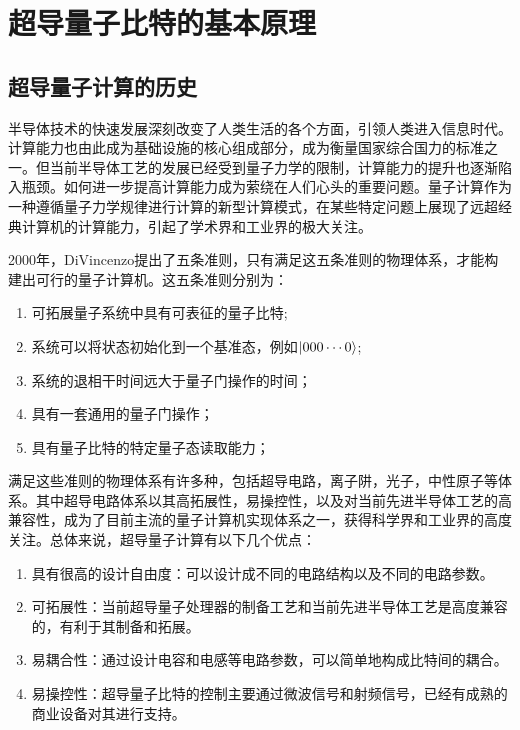 \chapter{超导量子比特的基本原理}
\section{超导量子计算的历史}
半导体技术的快速发展深刻改变了人类生活的各个方面，引领人类进入信息时代。计算能力也由此成为基础设施的核心组成部分，成为衡量国家综合国力的标准之一。但当前半导体工艺的发展已经受到量子力学的限制，计算能力的提升也逐渐陷入瓶颈。如何进一步提高计算能力成为萦绕在人们心头的重要问题。量子计算作为一种遵循量子力学规律进行计算的新型计算模式，在某些特定问题上展现了远超经典计算机的计算能力，引起了学术界和工业界的极大关注\cite{braumuller2022probing,arute2019quantum,jurcevic2021demonstration}。

2000年，DiVincenzo提出了五条准则，只有满足这五条准则的物理体系，才能构建出可行的量子计算机。这五条准则分别为\cite{divincenzo2000physical}：
\begin{enumerate}
	\item 可拓展量子系统中具有可表征的量子比特;
	\item 系统可以将状态初始化到一个基准态，例如$\left|000\cdots0\right>$;
	\item 系统的退相干时间远大于量子门操作的时间；
	\item 具有一套通用的量子门操作；
	\item 具有量子比特的特定量子态读取能力；
\end{enumerate}

满足这些准则的物理体系有许多种，包括超导电路\cite{havlivcek2019supervised,google2020hartree}，离子阱\cite{erhard2019characterizing,zhang2017observation}，光子\cite{zhong2020quantum,zhong2021phase}，中性原子\cite{semeghini2021probing,bernien2017probing}等体系。其中超导电路体系以其高拓展性，易操控性，以及对当前先进半导体工艺的高兼容性，成为了目前主流的量子计算机实现体系之一，获得科学界和工业界的高度关注\cite{braumuller2022probing,arute2019quantum,jurcevic2021demonstration}。总体来说，超导量子计算有以下几个优点：
\begin{enumerate}
	\item 具有很高的设计自由度：可以设计成不同的电路结构以及不同的电路参数。
	\item 可拓展性：当前超导量子处理器的制备工艺和当前先进半导体工艺是高度兼容的，有利于其制备和拓展。
	\item 易耦合性：通过设计电容和电感等电路参数，可以简单地构成比特间的耦合。
	\item 易操控性：超导量子比特的控制主要通过微波信号和射频信号，已经有成熟的商业设备对其进行支持。
\end{enumerate}

